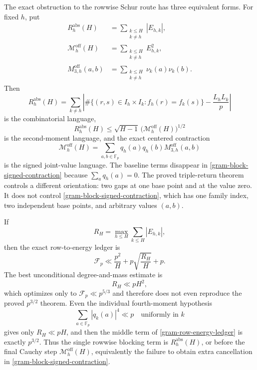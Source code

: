\begin{remark}
\label{gram-blocking-terms}
The exact obstruction to the rowwise Schur route has three equivalent
forms.  For fixed $h$, put
\begin{align*}
 R_h^{\mathrm{abs}}(H)
 &=\sum_{\substack{k\le H\\k\ne h}}|E_{h,k}|,\\
 \mathcal M_h^{\mathrm{off}}(H)
 &=\sum_{\substack{k\le H\\k\ne h}}E_{h,k}^2,\\
 M_{3,h}^{\mathrm{off}}(a,b)
 &=\sum_{\substack{k\le H\\k\ne h}}\nu_k(a)\nu_k(b).
\end{align*}
Then
\begin{equation}
 R_h^{\mathrm{abs}}(H)
 =\sum_{k\ne h}
 \left|
 \#\{(r,s)\in I_h\times I_k:f_h(r)=f_k(s)\}
 -\frac{L_hL_k}{p}
 \right|
 \label{gram-block-combinatorial}
\end{equation}
is the combinatorial language,
\begin{equation}
 R_h^{\mathrm{abs}}(H)
 \le\sqrt{H-1}\,
 \bigl(\mathcal M_h^{\mathrm{off}}(H)\bigr)^{1/2}
 \label{gram-block-second-moment}
\end{equation}
is the second-moment language, and the exact centered contraction
\begin{equation}
 \mathcal M_h^{\mathrm{off}}(H)
 =\sum_{a,b\in\mathbb F_p}
 q_h(a)q_h(b)M_{3,h}^{\mathrm{off}}(a,b)
 \label{gram-block-signed-contraction}
\end{equation}
is the signed joint-value language.  The baseline terms disappear in
\eqref{gram-block-signed-contraction} because $\sum_aq_h(a)=0$.
The proved triple-return theorem controls a different orientation: two
gaps at one base point and at the value zero.  It does not control
\eqref{gram-block-signed-contraction}, which has one family index, two
independent base points, and arbitrary values $(a,b)$.

If
\[
 R_H=\max_{h\le H}\sum_{k\le H}|E_{h,k}|,
\]
then the exact row-to-energy ledger is
\begin{equation}
 \mathcal F_p
 \ll\frac{p^2}{H}
   +p\sqrt{\frac{R_H}{H}}+p.
 \label{gram-row-energy-ledger}
\end{equation}
The best unconditional degree-and-mass estimate is
\[
 R_H\ll pH^2,
\]
which optimizes only to $\mathcal F_p\ll p^{5/3}$ and therefore does not
even reproduce the proved $p^{3/2}$ theorem.  Even the individual
fourth-moment hypothesis
\[
 \sum_{a\in\mathbb F_p}|q_k(a)|^4\ll p
 \quad\text{uniformly in }k
\]
gives only $R_H\ll pH$, and then the middle term of
\eqref{gram-row-energy-ledger} is exactly $p^{3/2}$.  Thus the single
rowwise blocking term is $R_h^{\mathrm{abs}}(H)$, or before the final
Cauchy step $\mathcal M_h^{\mathrm{off}}(H)$, equivalently the failure to
obtain extra cancellation in
\eqref{gram-block-signed-contraction}.


\end{remark}
